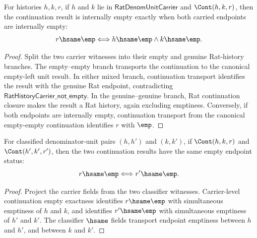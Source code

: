 \begin{theorem}
\label{thm:rat-denom-unit-continuation-result-empty-iff}
For histories $h,k,r$, if $h$ and $k$ lie in
$\mathsf{RatDenomUnitCarrier}$ and $\Cont(h,k,r)$, then the continuation
result is internally empty exactly when both carried endpoints are internally
empty:
$$
r\hsame\emp
\Longleftrightarrow
h\hsame\emp\wedge k\hsame\emp.
$$
\end{theorem}
\begin{proof}
Split the two carrier witnesses into their empty and genuine Rat-history
branches. The empty--empty branch transports the continuation to the canonical
empty-left unit result. In either mixed branch, continuation transport
identifies the result with the genuine Rat endpoint, contradicting
$\mathsf{RatHistoryCarrier\_not\_empty}$. In the genuine--genuine branch, Rat
continuation closure makes the result a Rat history, again excluding emptiness.
Conversely, if both endpoints are internally empty, continuation transport from
the canonical empty-empty continuation identifies $r$ with $\emp$.
\end{proof}

\begin{theorem}
\label{thm:rat-denom-unit-classifier-continuation-result-empty-iff}
For classified denominator-unit pairs $(h,h')$ and $(k,k')$, if
$\Cont(h,k,r)$ and $\Cont(h',k',r')$, then the two continuation results have
the same empty endpoint status:
$$
r\hsame\emp\Longleftrightarrow r'\hsame\emp.
$$
\end{theorem}
\begin{proof}
Project the carrier fields from the two classifier witnesses. Carrier-level
continuation empty exactness identifies $r\hsame\emp$ with simultaneous
emptiness of $h$ and $k$, and identifies $r'\hsame\emp$ with simultaneous
emptiness of $h'$ and $k'$. The classifier $\hsame$ fields transport endpoint
emptiness between $h$ and $h'$, and between $k$ and $k'$.
\end{proof}

